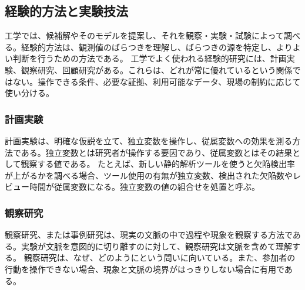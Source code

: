 \documentclass[a4paper,11pt]{ltjsarticle}
\numberwithin{figure}{section}
\numberwithin{table}{section}
\begin{document}
\subsection{経験的方法と実験技法}
工学では、候補解やそのモデルを提案し、それを観察・実験・試験によって調べる。経験的方法は、観測値のばらつきを理解し、ばらつきの源を特定し、よりよい判断を行うための方法である。
工学でよく使われる経験的研究には、計画実験、観察研究、回顧研究がある。これらは、どれが常に優れているという関係ではない。操作できる条件、必要な証拠、利用可能なデータ、現場の制約に応じて使い分ける。
\subsubsection{計画実験}
計画実験は、明確な仮説を立て、独立変数を操作し、従属変数への効果を測る方法である。独立変数とは研究者が操作する要因であり、従属変数とはその結果として観察する値である。
たとえば、新しい静的解析ツールを使うと欠陥検出率が上がるかを調べる場合、ツール使用の有無が独立変数、検出された欠陥数やレビュー時間が従属変数になる。独立変数の値の組合せを処置と呼ぶ。
\subsubsection{観察研究}
観察研究、または事例研究は、現実の文脈の中で過程や現象を観察する方法である。実験が文脈を意図的に切り離すのに対して、観察研究は文脈を含めて理解する。
観察研究は、なぜ、どのようにという問いに向いている。また、参加者の行動を操作できない場合、現象と文脈の境界がはっきりしない場合に有用である。
\end{document}
